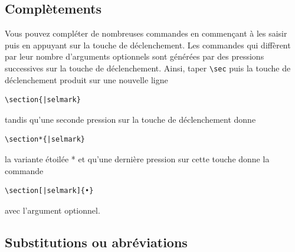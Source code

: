 \documentclass[11pt,french]{article}
\begin{document}
\subsection{Complètements}

Vous pouvez compléter de nombreuses commandes en commençant à les saisir puis en appuyant sur la touche de déclenchement. Les commandes qui diffèrent par leur nombre d'arguments optionnels sont générées par des pressions successives sur la touche de déclenchement. Ainsi, taper \verb|\sec| puis la touche de déclenchement produit sur une nouvelle ligne

\begin{verbatim}
\section{|selmark}
\end{verbatim}
tandis qu'une seconde pression sur la touche de déclenchement donne
\begin{verbatim}
\section*{|selmark}
\end{verbatim}
la variante étoilée * et qu'une dernière pression sur cette touche donne la commande
\begin{verbatim}
\section[|selmark]{•}
\end{verbatim}
avec l'argument optionnel.

\subsection{Substitutions ou abréviations}
\end{document}
